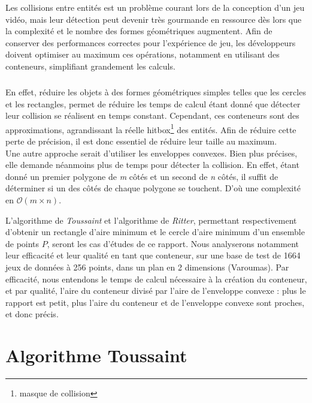 \documentclass[a4paper, 12pt]{report}
\newcommand{\bigO}{\mathcal{O}}
\begin{document}
\newpage
\begin{small}
Les collisions entre entités est un problème courant lors de la conception d'un jeu vidéo, mais leur détection peut devenir très gourmande en ressource dès lors que la complexité et le nombre des formes géométriques augmentent. Afin de conserver des performances correctes pour l'expérience de jeu, les développeurs doivent optimiser au maximum ces opérations, notamment en utilisant des conteneurs, simplifiant grandement les calculs.
\paragraph{}
En effet, réduire les objets à des formes géométriques simples telles que les cercles et les rectangles, permet de réduire les temps de calcul étant donné que détecter leur collision se réalisent en temps constant. Cependant, ces conteneurs sont des approximations, agrandissant la réelle hitbox\footnote{masque de collision} des entités. Afin de réduire cette perte de précision, il est donc essentiel de réduire leur taille au maximum. \\
Une autre approche serait d'utiliser les enveloppes convexes. Bien plus précises, elle demande néanmoins plus de temps pour détecter la collision. En effet, étant donné un premier polygone de \emph{m} côtés et un second de \emph{n} côtés, il suffit de déterminer si un des côtés de chaque polygone se touchent. D'où une complexité en $\bigO(m \times n)$. 

L'algorithme de \emph{Toussaint} et l'algorithme de \emph{Ritter}, permettant respectivement d'obtenir un rectangle d'aire minimum et le cercle d'aire minimum d'un ensemble de points $P$, seront les cas d'études de ce rapport. Nous analyserons notamment leur efficacité et leur qualité en tant que conteneur, sur une base de test de 1664 jeux de données à 256 points, dans un plan en 2 dimensions (Varoumas). Par efficacité, nous entendons le temps de calcul nécessaire à la création du conteneur, et par qualité, l'aire du conteneur divisé par l'aire de l'enveloppe convexe : plus le rapport est petit, plus l'aire du conteneur et de l'enveloppe convexe sont proches, et donc précis.
\end{small}
\chapter{Algorithme Toussaint}
\end{document}
